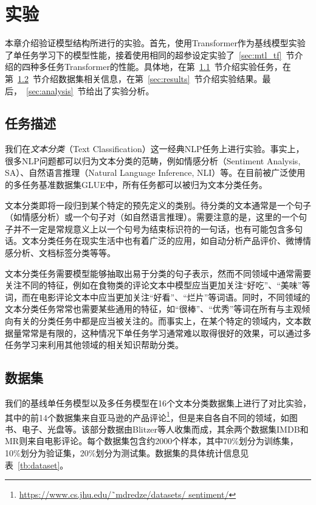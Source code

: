 \chapter{实验}
\label{cha:exp}
本章介绍验证模型结构所进行的实验。首先，使用Transformer作为基线模型实验了单任务学习下的模型性能，接着使用相同的超参设定实验了~\ref{sec:mtl_tf}~节介绍的四种多任务Transformer的性能。具体地，在第~\ref{sec:task}~节介绍实验任务，在第~\ref{sec:ds}~节介绍数据集相关信息，在第~\ref{sec:results}~节介绍实验结果。最后，~\ref{sec:analysis}~节给出了实验分析。

\section{任务描述}
\label{sec:task}
我们在\emph{文本分类}（Text Classification）这一经典NLP任务上进行实验。事实上，很多NLP问题都可以归为文本分类的范畴，例如情感分析（Sentiment Analysis, SA）、自然语言推理（Natural Language Inference, NLI）等。在目前被广泛使用的多任务基准数据集GLUE\cite{DBLP:conf/emnlp/WangSMHLB18}中，所有任务都可以被归为文本分类任务。

文本分类即将一段归到某个特定的预先定义的类别。待分类的文本通常是一个句子（如情感分析）或一个句子对（如自然语言推理）。需要注意的是，这里的一个句子并不一定是常规意义上以一个句号为结束标识符的一句话，也有可能包含多句话。文本分类任务在现实生活中也有着广泛的应用，如自动分析产品评价、微博情感分析、文档标签分类等等。

文本分类任务需要模型能够抽取出易于分类的句子表示，然而不同领域中通常需要关注不同的特征，例如在食物类的评论文本中模型应当更加关注“好吃”、“美味”等词，而在电影评论文本中应当更加关注“好看”、“烂片”等词语。同时，不同领域的文本分类任务常常也需要某些通用的特征，如“很棒”、“优秀”等词在所有与主观倾向有关的分类任务中都是应当被关注的。而事实上，在某个特定的领域内，文本数据量常常是有限的，这种情况下单任务学习通常难以取得很好的效果，可以通过多任务学习来利用其他领域的相关知识帮助分类。

\section{数据集}
\label{sec:ds}
我们的基线单任务模型以及多任务模型在16个文本分类数据集上进行了对比实验，其中的前14个数据集来自亚马逊的产品评论\footnote{\url{https://www.cs.jhu.edu/˜mdredze/datasets/ sentiment/}}，但是来自各自不同的领域，如图书、电子、光盘等。该部分数据由Blitzer等人\cite{DBLP:conf/acl/BlitzerDP07}收集而成，其余两个数据集IMDB\cite{DBLP:conf/acl/MaasDPHNP11}和MR\cite{DBLP:conf/acl/PangL05}则来自电影评论。每个数据集包含约2000个样本，其中70\%划分为训练集，10\%划分为验证集，20\%划分为测试集。数据集的具体统计信息见表~\ref{tb:dataset}。

